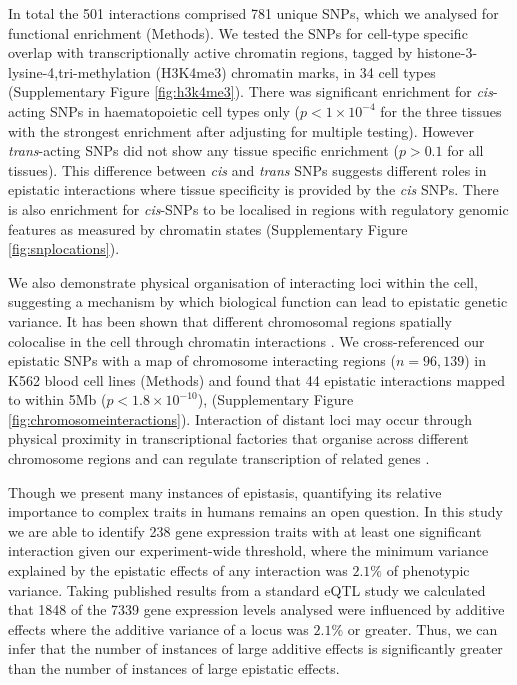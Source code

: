 \documentclass{article}
\begin{document}
In total the 501 interactions comprised 781 unique SNPs, which we analysed for functional enrichment (Methods). We tested the SNPs for cell-type specific overlap with transcriptionally active chromatin regions, tagged by histone-3-lysine-4,tri-methylation (H3K4me3) chromatin marks, in 34 cell types \cite{Trynka2013} (Supplementary Figure \ref{fig:h3k4me3}). There was significant enrichment for \emph{cis}-acting SNPs in haematopoietic cell types only ($p < 1 \times 10^{-4}$ for the three tissues with the strongest enrichment after adjusting for multiple testing). However \emph{trans}-acting SNPs did not show any tissue specific enrichment ($p > 0.1$ for all tissues). This difference between \emph{cis} and \emph{trans} SNPs suggests different roles in epistatic interactions where tissue specificity is provided by the \emph{cis} SNPs. There is also enrichment for \emph{cis}-SNPs to be localised in regions with regulatory genomic features as measured by chromatin states \cite{Hoffman2012} (Supplementary Figure \ref{fig:snplocations}).

We also demonstrate physical organisation of interacting loci within the cell, suggesting a mechanism by which biological function can lead to epistatic genetic variance. It has been shown that different chromosomal regions spatially colocalise in the cell through chromatin interactions \cite{Lieberman-Aiden2009}. We cross-referenced our epistatic SNPs with a map of chromosome interacting regions ($n = 96,139$) in K562 blood cell lines \cite{Lan2012} (Methods) and found that 44 epistatic interactions mapped to within 5Mb ($p < 1.8 \times 10^{-10}$), (Supplementary Figure \ref{fig:chromosomeinteractions}). Interaction of distant loci may occur through physical proximity in transcriptional factories that organise across different chromosome regions and can regulate transcription of related genes \cite{Osborne2004, Rieder2012}.


Though we present many instances of epistasis, quantifying its relative importance to complex traits in humans remains an open question. In this study we are able to identify 238 gene expression traits with at least one significant interaction given our experiment-wide threshold, where the minimum variance explained by the epistatic effects of any interaction was $2.1\%$ of phenotypic variance. Taking published results from a standard eQTL study \cite{Powell2012} we calculated that 1848 of the 7339 gene expression levels analysed were influenced by additive effects where the additive variance of a locus was $2.1\%$ or greater. Thus, we can infer that the number of instances of large additive effects is significantly greater than the number of instances of large epistatic effects.
\end{document}
